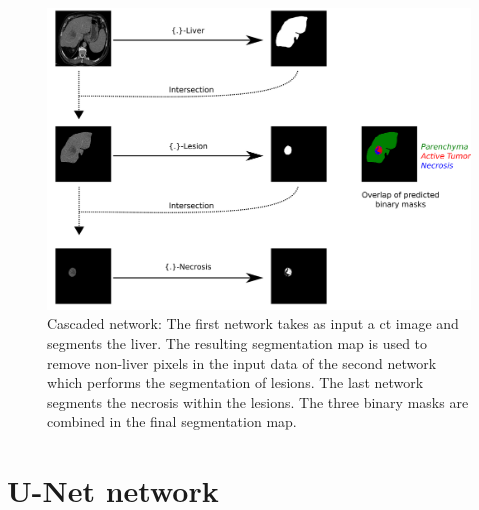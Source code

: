\begin{figure}[th!]
	\centering
	\includegraphics[width=0.7\linewidth]{../SemanticSeg/images/Cascade2}
	\caption{Cascaded network: The first network takes as input a \ac{ct} image and segments the liver. The resulting segmentation map is used to remove non-liver pixels in the input data of the second network which performs the segmentation of lesions. The last network segments the necrosis within the lesions. The three binary masks are combined in the final segmentation map.}
	\label{CARS_Cascade}
\end{figure}


\section{U-Net network}

